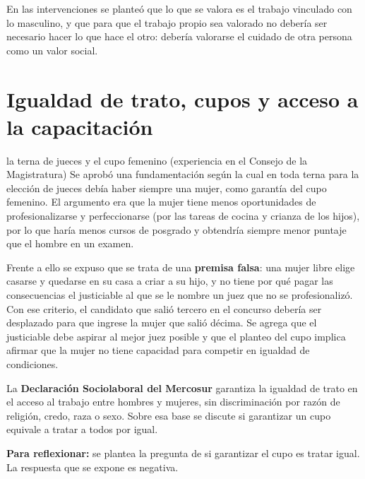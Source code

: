 \documentclass[12pt,oneside]{book}
\begin{document}
En las intervenciones se planteó que lo que se valora es el trabajo vinculado con lo masculino, y que para que el trabajo propio sea valorado no debería ser necesario hacer lo que hace el otro: debería valorarse el cuidado de otra persona como un valor social.

\section{Igualdad de trato, cupos y acceso a la capacitación}

\begin{example}{la terna de jueces y el cupo femenino (experiencia en el Consejo de la Magistratura)}
Se aprobó una fundamentación según la cual en toda terna para la elección de jueces debía haber siempre una mujer, como garantía del cupo femenino. El argumento era que la mujer tiene menos oportunidades de profesionalizarse y perfeccionarse (por las tareas de cocina y crianza de los hijos), por lo que haría menos cursos de posgrado y obtendría siempre menor puntaje que el hombre en un examen.

Frente a ello se expuso que se trata de una \textbf{premisa falsa}: una mujer libre elige casarse y quedarse en su casa a criar a su hijo, y no tiene por qué pagar las consecuencias el justiciable al que se le nombre un juez que no se profesionalizó. Con ese criterio, el candidato que salió tercero en el concurso debería ser desplazado para que ingrese la mujer que salió décima. Se agrega que el justiciable debe aspirar al mejor juez posible y que el planteo del cupo implica afirmar que la mujer no tiene capacidad para competir en igualdad de condiciones.
\end{example}

La \textbf{Declaración Sociolaboral del Mercosur} garantiza la igualdad de trato en el acceso al trabajo entre hombres y mujeres, sin discriminación por razón de religión, credo, raza o sexo. Sobre esa base se discute si garantizar un cupo equivale a tratar a todos por igual.

\begin{note}
\textbf{Para reflexionar:} se plantea la pregunta de si garantizar el cupo es tratar igual. La respuesta que se expone es negativa.
\end{note}
\end{document}
